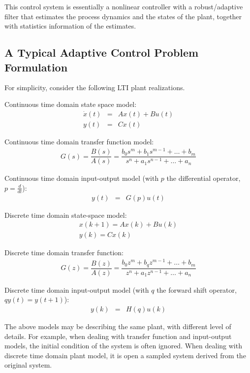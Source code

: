 This control system is essentially a nonlinear controller with a robust/adaptive filter that estimates the process dynamics and the states of the plant, together with statistics information of the estimates.

\subsection{A Typical Adaptive Control Problem Formulation}

For simplicity, consider the following LTI plant realizations.

Continuous time domain state space model:
\begin{eqnarray}
	\dot{x}(t) &=& Ax(t) + Bu(t) \nonumber \\
	y(t) &=& Cx(t) \nonumber
\end{eqnarray}

Continuous time domain transfer function model:
\begin{eqnarray}
	G(s) = \dfrac{B(s)}{A(s)} = \dfrac{b_0s^m + b_1s^{m-1} + \ldots + b_m}{s^n + a_1s^{n-1} + \ldots + a_n} \nonumber
\end{eqnarray}

Continuous time domain input-output model (with $p$ the differential operator, $p=\frac{d}{dt}$):
\begin{eqnarray}
	y(t) &=& G(p)u(t) \nonumber
\end{eqnarray}

Discrete time domain state-space model:
\begin{eqnarray}
	x(k+1) = Ax(k) + Bu(k) \nonumber \\
	y(k) = Cx(k) \nonumber
\end{eqnarray}

Discrete time domain transfer function:
\begin{eqnarray}
	G(z) = \dfrac{B(z)}{A(z)} = \dfrac{b_0z^m + b_qz^{m-1} + \ldots + b_m}{z^n + a_1z^{n-1} + \ldots + a_n} \nonumber
\end{eqnarray}

Discrete time domain input-output model (with $q$ the forward shift operator, $qy(t) = y(t+1)$):
\begin{eqnarray}
	y(k) &=& H(q)u(k) \nonumber
\end{eqnarray}

The above models may be describing the same plant, with different level of details. For example, when dealing with transfer function and input-output models, the initial condition of the system is often ignored. When dealing with discrete time domain plant model, it is open a sampled system derived from the original system.

